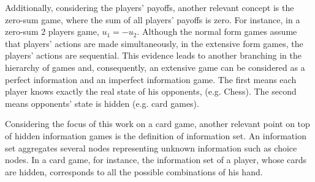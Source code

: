 Additionally, considering the players' payoffs, another relevant concept is the zero-sum game, where the sum of all players' payoffs is zero.
For instance, in a zero-sum 2 players game, $u_1 = -u_2$.
Although the normal form games assume that players' actions are made simultaneously, in the extensive form games, the players' actions are sequential.
This evidence leads to another branching in the hierarchy of games and, consequently, an extensive game can be considered as a perfect information and an imperfect information game.
The first means each player knows exactly the real state of his opponents, (e.g. Chess).
The second means opponents' state is hidden (e.g. card games).

Considering the focus of this work on a card game, another relevant point on top of hidden information games is the definition of information set.
An information set aggregates several nodes representing unknown information such as choice nodes. In a card game, for instance, the information set of a player, whose cards are hidden, corresponds to all the possible combinations of his hand.




